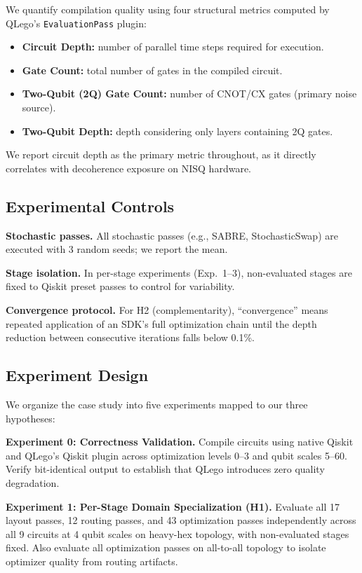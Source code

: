 \documentclass[conference]{IEEEtran}
\begin{document}
We quantify compilation quality using four structural metrics computed by QLego's \texttt{EvaluationPass} plugin:
\begin{itemize}[nosep]
    \item \textbf{Circuit Depth:} number of parallel time steps required for execution.
    \item \textbf{Gate Count:} total number of gates in the compiled circuit.
    \item \textbf{Two-Qubit (2Q) Gate Count:} number of CNOT/CX gates (primary noise source).
    \item \textbf{Two-Qubit Depth:} depth considering only layers containing 2Q gates.
\end{itemize}

We report circuit depth as the primary metric throughout, as it directly correlates with decoherence exposure on NISQ hardware.

\subsection{Experimental Controls}

\textbf{Stochastic passes.}
All stochastic passes (e.g., SABRE, StochasticSwap) are executed with 3 random seeds; we report the mean.

\textbf{Stage isolation.}
In per-stage experiments (Exp.~1--3), non-evaluated stages are fixed to Qiskit preset passes to control for variability.

\textbf{Convergence protocol.}
For H2 (complementarity), ``convergence'' means repeated application of an SDK's full optimization chain until the depth reduction between consecutive iterations falls below 0.1\%.

\subsection{Experiment Design}

We organize the case study into five experiments mapped to our three hypotheses:

\textbf{Experiment 0: Correctness Validation.}
Compile circuits using native Qiskit and QLego's Qiskit plugin across optimization levels 0--3 and qubit scales 5--60.
Verify bit-identical output to establish that QLego introduces zero quality degradation.

\textbf{Experiment 1: Per-Stage Domain Specialization (H1).}
Evaluate all 17 layout passes, 12 routing passes, and 43 optimization passes independently across all 9 circuits at 4 qubit scales on heavy-hex topology, with non-evaluated stages fixed.
Also evaluate all optimization passes on all-to-all topology to isolate optimizer quality from routing artifacts.
\end{document}
